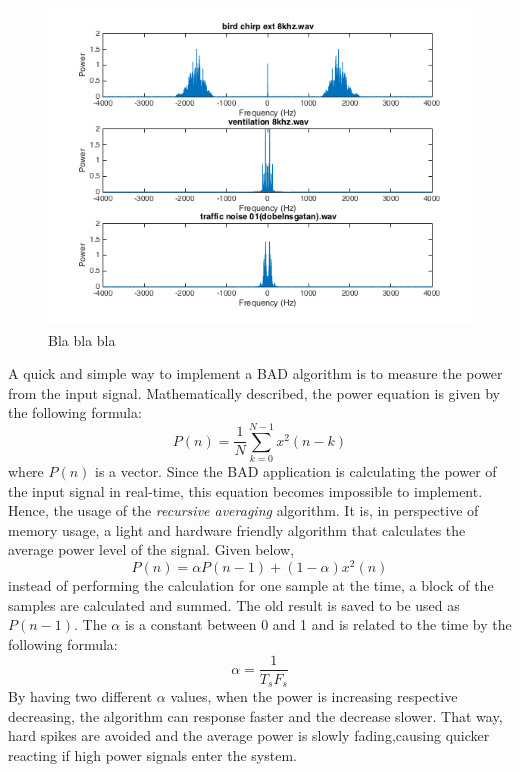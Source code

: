 
\begin{figure}
  \centering
  \includegraphics[width=1\textwidth]{sections/freq_spec_noise_linkaxis.png}
  \caption{Bla bla bla}
  \label{fig:noise_spec}
\end{figure}

A quick and simple way to implement a BAD algorithm is to measure the power from the input signal.
Mathematically described, the power equation is given by the following formula: 
\[
P(n) = \frac{1}{N} \sum\limits_{k=0}^{N-1} x^2(n-k)
\]
where $P(n)$ is a vector. Since the BAD application is calculating the power of the input signal in 
real-time, this equation becomes impossible to implement. Hence, the usage of the \emph{recursive
averaging} algorithm. It is, in perspective of memory usage, a light and hardware friendly algorithm 
that calculates the average power level of the signal. Given below,
\[
P(n) = \alpha P(n-1)+(1-\alpha)x^2(n)
\]
instead of performing the calculation for one sample at the time, a block of the samples are calculated and summed.
The old result is saved to be used as $P(n-1)$. The $\alpha$ is a constant between 0 and 1 and is related to the 
time by the following formula:
\[
\alpha = \frac{1}{T_{s}F_{s}}
\]
By having two different $\alpha$ values, when the power is increasing respective decreasing, the algorithm
can response faster and the decrease slower. That way, hard spikes are avoided and the average power is slowly
fading,causing quicker reacting if high power signals enter the system.

